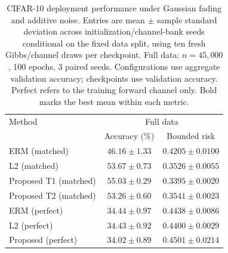 \begin{table}[t]
\centering\footnotesize
\setlength{\tabcolsep}{3pt}
\caption{CIFAR-10 deployment performance under Gaussian fading and additive noise. Entries are mean $\pm$ sample standard deviation across initialization/channel-bank seeds conditional on the fixed data split, using ten fresh Gibbs/channel draws per checkpoint. Full data: $n=45,000$, 100 epochs, 3 paired seeds. Configurations use aggregate validation accuracy; checkpoints use validation accuracy. Perfect refers to the training forward channel only. Bold marks the best mean within each metric.}
\label{tab:sim_cifar}
\begin{tabular}{lcc}
\toprule
Method & \multicolumn{2}{c}{Full data}\\
 & Accuracy (\%) & Bounded risk\\\midrule
ERM (matched) & $46.16\pm1.33$ & $0.4205\pm0.0100$\\
L2 (matched) & $53.67\pm0.73$ & $0.3526\pm0.0055$\\
Proposed T1 (matched) & $\mathbf{55.03\pm0.29}$ & $\mathbf{0.3395\pm0.0020}$\\
Proposed T2 (matched) & $53.26\pm0.60$ & $0.3541\pm0.0023$\\
ERM (perfect) & $34.44\pm0.97$ & $0.4438\pm0.0086$\\
L2 (perfect) & $34.43\pm0.92$ & $0.4400\pm0.0029$\\
Proposed (perfect) & $34.02\pm0.89$ & $0.4501\pm0.0214$\\
\bottomrule
\end{tabular}
\end{table}
